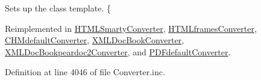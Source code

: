 \-Sets up the class template. \{ 

\-Reimplemented in \hyperlink{class_h_t_m_l_smarty_converter_afec21ed9dd3b8ac7495c4d6d5741d7af}{\-H\-T\-M\-L\-Smarty\-Converter}, \hyperlink{class_h_t_m_lframes_converter_afec21ed9dd3b8ac7495c4d6d5741d7af}{\-H\-T\-M\-Lframes\-Converter}, \hyperlink{class_c_h_mdefault_converter_afec21ed9dd3b8ac7495c4d6d5741d7af}{\-C\-H\-Mdefault\-Converter}, \hyperlink{class_x_m_l_doc_book_converter_afec21ed9dd3b8ac7495c4d6d5741d7af}{\-X\-M\-L\-Doc\-Book\-Converter}, \hyperlink{class_x_m_l_doc_bookpeardoc2_converter_afec21ed9dd3b8ac7495c4d6d5741d7af}{\-X\-M\-L\-Doc\-Bookpeardoc2\-Converter}, and \hyperlink{class_p_d_fdefault_converter_afec21ed9dd3b8ac7495c4d6d5741d7af}{\-P\-D\-Fdefault\-Converter}.



\-Definition at line 4046 of file \-Converter.\-inc.


